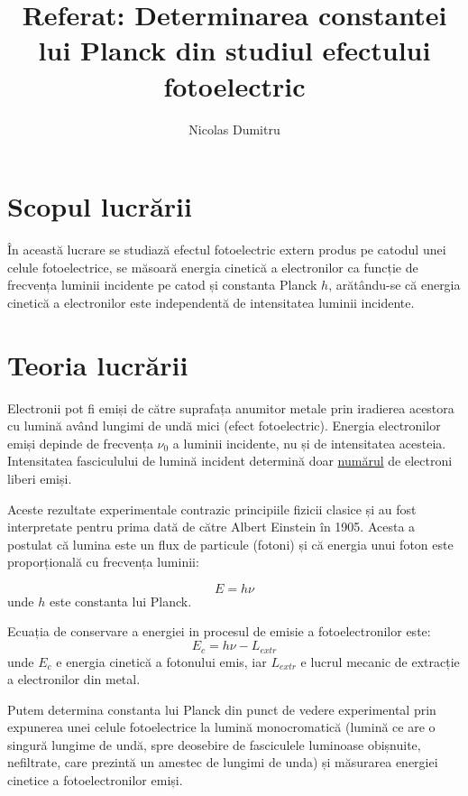 \documentclass[a4paper]{article}
\title{Referat: Determinarea constantei lui Planck din studiul efectului
fotoelectric}
\author{Nicolas Dumitru}
\date{}
\begin{document}
\maketitle

\section{Scopul lucrării}
În această lucrare se studiază efectul fotoelectric extern produs pe catodul
unei celule fotoelectrice, se măsoară energia cinetică a electronilor ca funcție
de frecvența luminii incidente pe catod și constanta Planck $h$, arătându-se că
energia cinetică a electronilor este independentă de intensitatea luminii
incidente.

\section{Teoria lucrării}

Electronii pot fi emiși de către suprafața anumitor metale prin iradierea
acestora cu lumină având lungimi de undă mici (efect fotoelectric). Energia
electronilor emiși depinde de frecvența $\nu_0$ a luminii incidente, nu și de
intensitatea acesteia. Intensitatea fasciculului de lumină incident determină
doar \underline{numărul} de electroni liberi emiși.

Aceste rezultate experimentale contrazic principiile fizicii clasice și au fost
interpretate pentru prima dată de către Albert Einstein în 1905. Acesta a
postulat că lumina este un flux de particule (fotoni) și că energia unui foton
este proporțională cu frecvența luminii:

\begin{equation}
	E = h \nu
\end{equation}
unde $h$ este constanta lui Planck.

Ecuația de conservare a energiei in procesul de emisie a fotoelectronilor este:
\begin{equation}
	E_c = h \nu - L_{extr}
\end{equation}
unde $E_c$ e energia cinetică a fotonului emis, iar $L_{extr}$ e lucrul mecanic
de extracție a electronilor din metal.

Putem determina constanta lui Planck din punct de vedere experimental prin
expunerea unei celule fotoelectrice la lumină monocromatică (lumină ce are o
singură lungime de undă, spre deosebire de fasciculele luminoase obișnuite,
nefiltrate, care prezintă un amestec de lungimi de unda) și măsurarea energiei
cinetice a fotoelectronilor emiși.
\end{document}

